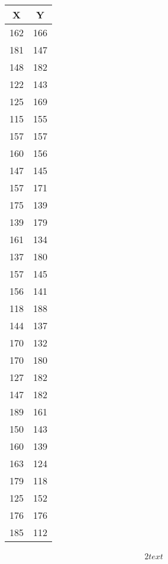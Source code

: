 \documentclass{article}%
\begin{document}
%
\normalsize%
\begin{tabular}{c|c}
\toprule
  X &   Y \\
\midrule
162 & 166 \\
181 & 147 \\
148 & 182 \\
122 & 143 \\
125 & 169 \\
115 & 155 \\
157 & 157 \\
160 & 156 \\
147 & 145 \\
157 & 171 \\
175 & 139 \\
139 & 179 \\
161 & 134 \\
137 & 180 \\
157 & 145 \\
156 & 141 \\
118 & 188 \\
144 & 137 \\
170 & 132 \\
170 & 180 \\
127 & 182 \\
147 & 182 \\
189 & 161 \\
150 & 143 \\
160 & 139 \\
163 & 124 \\
179 & 118 \\
125 & 152 \\
176 & 176 \\
185 & 112 \\
\bottomrule
\end{tabular}
%
\begin{alignat*}{2}%
text%
\end{alignat*}%
\end{document}
